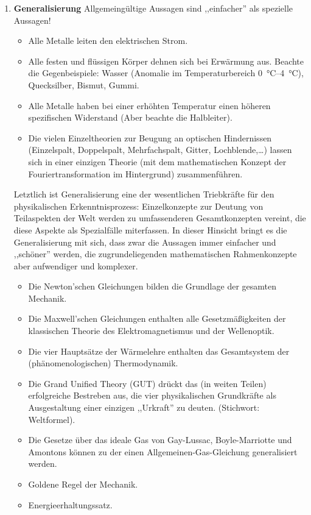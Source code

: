 \begin{enumerate}
	
	\item \textbf{Generalisierung}
	Allgemeing\"{u}ltige Aussagen sind ,,einfacher'' als spezielle Aussagen!
	
	\mip
	\begin{beisp2}
	\begin{itemize}
		\item Alle Metalle leiten den elektrischen Strom.
		\item Alle festen und fl\"{u}ssigen K\"{o}rper dehnen sich bei Erw\"{a}rmung aus.
		\nip
		Beachte die Gegenbeispiele: Wasser (Anomalie im Temperaturbereich
		\SIrange{0}{4}{\celsius}), Quecksilber, Bismut, Gummi.
		\item Alle Metalle haben bei einer erh\"{o}hten Temperatur einen h\"{o}heren
		spezifischen Widerstand (Aber beachte die Halbleiter).
		\item
		Die vielen Einzeltheorien zur Beugung an optischen
		Hindernissen (Einzelspalt, Doppelspalt, Mehrfachspalt, Gitter,
		Lochblende,\dots) lassen sich in einer einzigen Theorie
		(mit dem mathematischen Konzept der Fouriertransformation
		im Hintergrund) zusammenf\"{u}hren.
	\end{itemize}
	\end{beisp2}

	
	Letztlich ist Generalisierung eine der wesentlichen Triebkr\"{a}fte
	f\"{u}r den physikalischen Erkenntnisprozess: Einzelkonzepte zur Deutung
	von Teilaspekten der Welt werden zu umfassenderen Gesamtkonzepten
	vereint, die diese Aspekte als Spezialf\"{a}lle miterfassen.
	In dieser Hinsicht bringt es die Generalisierung mit sich,
	dass zwar die Aussagen immer einfacher und ,,sch\"{o}ner'' werden,
	die zugrundeliegenden mathematischen Rahmenkonzepte aber
	aufwendiger und komplexer.
	
	\mip
	\begin{beisp2}
	\begin{itemize}
		\item Die Newton'schen Gleichungen bilden die Grundlage der gesamten
		Mechanik.
		\item Die Maxwell'schen Gleichungen enthalten alle Gesetzm\"{a}{\ss}igkeiten
		der klassischen Theorie des Elektromagnetismus und der Wellenoptik.
		\item Die vier Haupts\"{a}tze der W\"{a}rmelehre enthalten das
		Gesamtsystem der (ph\"{a}nomenologischen) Thermodynamik.
		\item
		Die Grand Unified Theory (GUT) dr\"{u}ckt das (in weiten Teilen)
		erfolgreiche Bestreben aus, die vier physikalischen Grundkr\"{a}fte
		als Ausgestaltung einer einzigen ,,Urkraft'' zu deuten.
		(Stichwort: Weltformel).
		\item
		Die Gesetze \"{u}ber das ideale Gas von
		Gay-Lussac, Boyle-Marriotte und Amontons k\"{o}nnen zu der einen
		Allgemeinen-Gas-Gleichung generalisiert werden.
		\item
		Goldene Regel der Mechanik.
		\item
		Energieerhaltungssatz.
	\end{itemize}
	\end{beisp2}
	

\end{enumerate}
